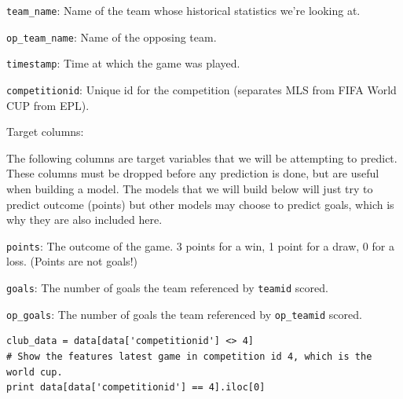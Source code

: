 \documentclass[12pt,fleqn]{article}\usepackage{../common}
\begin{document}
\verb!team_name!: Name of the team whose historical statistics we're looking at.

\verb!op_team_name!: Name of the opposing team.

\verb!timestamp!: Time at which the game was played.

\verb!competitionid!: Unique id for the competition (separates MLS from FIFA World CUP from EPL).

Target columns:

The following columns are target variables that we will be attempting to
predict. These columns must be dropped before any prediction is done, but
are useful when building a model. The models that we will build below will
just try to predict outcome (points) but other models may choose to predict
goals, which is why they are also included here.

\verb!points!: The outcome of the game. 3 points for a win, 1 point for a draw, 0
for a loss. (Points are not goals!)

\verb!goals!: The number of goals the team referenced by \verb!teamid! scored.

\verb!op_goals!: The number of goals the team referenced by
\verb!op_teamid! scored.

\begin{verbatim}
club_data = data[data['competitionid'] <> 4]
# Show the features latest game in competition id 4, which is the world cup.
print data[data['competitionid'] == 4].iloc[0]
\end{verbatim}
\end{document}
